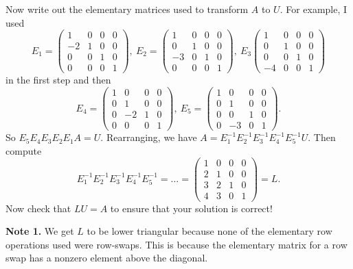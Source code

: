 \documentclass[english,12pt,a4paper]{scrartcl}
\begin{document}
\begin{itemize}
    Now write out the elementary matrices used to transform $A$ to $U$. For 
    example, I used
    \[
      E_1 =
      \begin{pmatrix}
        1 & 0 & 0 & 0 \\
        -2 & 1 & 0 & 0 \\
        0 & 0 & 1 & 0 \\
        0 & 0 & 0 & 1
      \end{pmatrix},
      \ E_2 =
      \begin{pmatrix}
        1 & 0 & 0 & 0 \\
        0 & 1 & 0 & 0 \\
        -3 & 0 & 1 & 0 \\
        0 & 0 & 0 & 1
      \end{pmatrix},
      \ E_3
      \begin{pmatrix}
        1 & 0 & 0 & 0 \\
        0 & 1 & 0 & 0 \\
        0 & 0 & 1 & 0 \\
        -4 & 0 & 0 & 1
      \end{pmatrix}
    \]
    in the first step and then
    \[
      E_4 =
      \begin{pmatrix}
        1 & 0 & 0 & 0 \\
        0 & 1 & 0 & 0 \\
        0 & -2 & 1 & 0 \\
        0 & 0 & 0 & 1
      \end{pmatrix},
      \ E_5 =
      \begin{pmatrix}
        1 & 0 & 0 & 0 \\
        0 & 1 & 0 & 0 \\
        0 & 0 & 1 & 0 \\
        0 & -3 & 0 & 1
      \end{pmatrix}.
    \]
    So $E_5 E_4 E_3 E_2 E_1 A = U$. Rearranging, we have $A = E_1^{-1} E_2^{-1} 
    E_3^{-1} E_4^{-1} E_5^{-1} U$. Then compute
    \[
      E_1^{-1} E_2^{-1} E_3^{-1} E_4^{-1} E_5^{-1} = \dots =
      \begin{pmatrix}
        1 & 0 & 0 & 0 \\
        2 & 1 & 0 & 0 \\
        3 & 2 & 1 & 0 \\
        4 & 3 & 0 & 1
      \end{pmatrix} = L.
    \]
    Now check that $LU = A$ to ensure that your solution is correct!

    \textbf{Note 1.} We get $L$ to be lower triangular because none of the 
    elementary row operations used were row-swaps. This is because the 
    elementary matrix for a row swap has a nonzero element above the diagonal.


\end{itemize}
\end{document}
